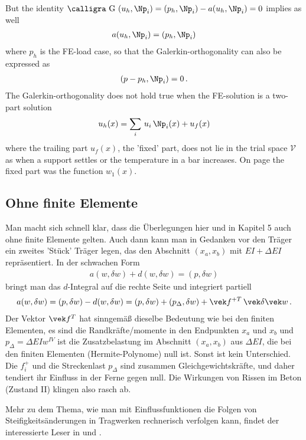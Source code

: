 But the identity $\text{\normalfont\calligra G\,\,}(u_h,\Np_i) = (p_h,\Np_i) - a(u_h,\Np_i) = 0$  implies as well
\begin{align}
a(u_h,\Np_i) = (p_h,\Np_i)
\end{align}
where $p_h$ is the FE-load case, so that the Galerkin-orthogonality can also be expressed as
\begin{align}
(p - p_h,\Np_i) = 0\,.
\end{align}
The Galerkin-orthogonality does not hold true when the FE-solution is a two-part solution
\begin{align}
u_h(x) = \sum_i\,u_i\,\Np_i(x)  + u_f(x)
\end{align}
where the trailing part $u_f(x)$, the 'fixed' part, does not lie in the trial space $\mathcal{V}$ as when a support settles or the temperature in a bar increases. On page \pageref{Eq36} the fixed part was the function $w_1(x)$.

\textcolor{blau2}{\subsection*{Ohne finite Elemente}}
Man macht sich schnell klar, dass die \"{U}berlegungen hier und in Kapitel 5 auch ohne finite Elemente gelten. Auch dann kann man in Gedanken vor den Tr\"{a}ger ein zweites 'St\"{u}ck' Tr\"{a}ger legen, das den Abschnitt $(x_a,x_b)$ mit $EI + \Delta EI$ repr\"{a}sentiert. In der schwachen Form
\begin{align}
a(w, \delta w) + d(w, \delta w) = (p,\delta w)
\end{align}
bringt man das $d$-Integral auf die rechte Seite und integriert partiell
\begin{align}
a(w, \delta w) = (p,\delta w) - d(w, \delta w) = (p,\delta w) + (p_\Delta, \delta w) + \vek f^{+ T}\,\vek \delta \vek w\,.
\end{align}
Der Vektor $\vek f^T$ hat sinngem\"{a}{\ss} dieselbe Bedeutung wie bei den finiten Elementen, es sind die Randkr\"{a}fte/momente in den Endpunkten $x_a$ und $x_b$ und $p_\Delta  = \Delta EI w^{IV}$ ist die Zusatzbelastung im Abschnitt $(x_a,x_b)$ aus $\Delta EI$, die bei den finiten Elementen (Hermite-Polynome) null ist. Sonst ist kein Unterschied. Die $f_i^+$ und die Streckenlast $p_\Delta$ sind zusammen Gleichgewichtskr\"{a}fte, und daher tendiert ihr Einfluss in der Ferne gegen null. Die Wirkungen von Rissen im Beton (Zustand II) klingen also rasch ab.

Mehr zu dem Thema, wie man mit Einflussfunktionen die Folgen von Steifigkeits\"{a}nderungen in Tragwerken rechnerisch verfolgen kann, findet der interessierte Leser in \cite{Ha5} und \cite{Ha6}.


